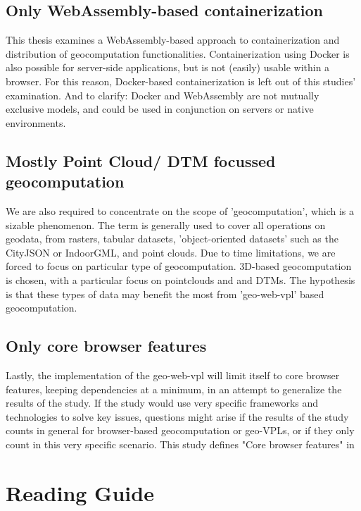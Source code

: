 \subsection*{Only WebAssembly-based containerization}
This thesis examines a WebAssembly-based approach to containerization and distribution of geocomputation functionalities. 
Containerization using Docker is also possible for server-side applications, but is not (easily) usable within a browser. 
For this reason, Docker-based containerization is left out of this studies' examination. 
And to clarify: Docker and WebAssembly are not mutually exclusive models, and could be used in conjunction on servers or native environments. 

\subsection*{Mostly Point Cloud/ DTM focussed geocomputation}
We are also required to concentrate on the scope of 'geocomputation', which is a sizable phenomenon.
The term is generally used to cover all operations on geodata, from rasters, tabular datasets, 'object-oriented datasets' such as the CityJSON or IndoorGML, and point clouds. 
Due to time limitations, we are forced to focus on particular type of geocomputation.
3D-based geocomputation is chosen, with a particular focus on pointclouds and and DTMs. 
The hypothesis is that these types of data may benefit the most from 'geo-web-vpl' based geocomputation.

\subsection*{Only core browser features}
Lastly, the implementation of the geo-web-vpl will limit itself to core browser features, keeping dependencies at a minimum, in an attempt to generalize the results of the study.
If the study would use very specific frameworks and technologies to solve key issues, questions might arise if the results of the study counts in general for browser-based geocomputation or geo-VPLs, or if they only count in this very specific scenario. 
This study defines "Core browser features" in 

\newpage
\section{Reading Guide}

